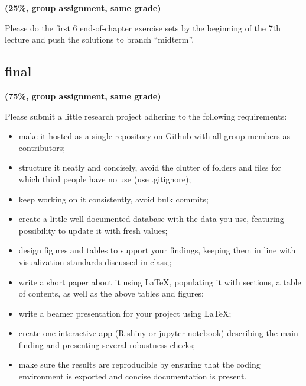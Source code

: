 \documentclass[12pt]{article}
\begin{document}
\textbf{(25\%, group assignment, same grade)}

Please do the first 6 end-of-chapter exercise sets by the beginning of the 7th lecture and push the solutions to branch ``midterm''.

\label{sub:midterm}


\subsection{final} %
\label{sub:final}

\textbf{(75\%, group assignment, same grade)}

Please submit a little research project adhering to the following requirements:

\begin{itemize}[topsep=0pt, itemsep=4pt, partopsep=0pt, parsep=0pt]
    \item make it hosted as a single repository on Github with all group members as contributors;
    \item structure it neatly and concisely, avoid the clutter of folders and files for which third people have no use (use .gitignore);
    \item keep working on it consistently, avoid bulk commits;
    \item create a little well-documented database with the data you use, featuring possibility to update it with fresh values;
    \item design figures and tables to support your findings, keeping them in line with visualization standards discussed in class;;
    \item write a short paper about it using LaTeX, populating it with sections, a table of contents, as well as the above tables and figures;
    \item write a beamer presentation for your project using LaTeX;
    \item create one interactive app (R shiny or jupyter notebook) describing the main finding and presenting several robustness checks;
    \item make sure the results are reproducible by ensuring that the coding environment is exported and concise documentation is present.
\end{itemize}


\end{document}
